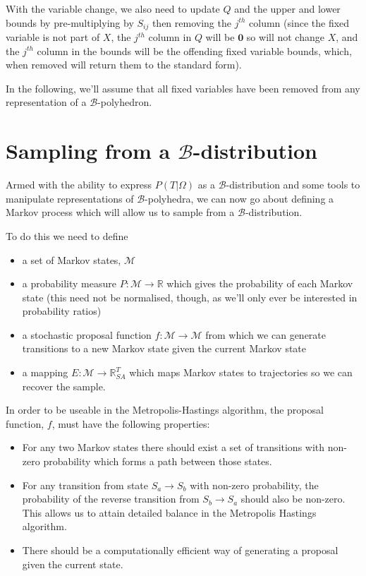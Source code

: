 \documentclass{article}
\begin{document}
With the variable change, we also need to update $Q$ and the upper and lower bounds by pre-multiplying by $S_{ij}$ then removing the $j^{th}$ column (since the fixed variable is not part of $X$, the $j^{th}$ column in $Q$ will be $\mathbf{0}$ so will not change $X$, and the $j^{th}$ column in the bounds will be the offending fixed variable bounds, which, when removed will return them to the standard form).

In the following, we'll assume that all fixed variables have been removed from any representation of a $\mathcal{B}$-polyhedron.

\section{Sampling from a $\mathcal{B}$-distribution}

Armed with the ability to express $P(T|\Omega)$ as a $\mathcal{B}$-distribution and some tools to manipulate representations of $\mathcal{B}$-polyhedra, we can now go about defining a Markov process which will allow us to sample from a $\mathcal{B}$-distribution.

To do this we need to define
\begin{itemize}
\item a set of Markov states, $\mathcal{M}$

\item a probability measure $P: \mathcal{M} \to \mathbb{R}$ which gives the probability of each Markov state (this need not be normalised, though, as we'll only ever be interested in probability ratios)

\item a stochastic proposal function $f:\mathcal{M} \to \mathcal{M}$ from which we can generate transitions to a new Markov state given the current Markov state

\item a mapping $E:\mathcal{M} \to \mathbb{R}^T_{SA}$ which maps Markov states to trajectories so we can recover the sample.
\end{itemize}

In order to be useable in the Metropolis-Hastings algorithm, the proposal function, $f$, must have the following properties:
\begin{itemize}
	\item For any two Markov states there should exist a set of transitions with non-zero probability which forms a path between those states.
	
	\item For any transition from state $S_a \to S_b$ with non-zero probability, the probability of the reverse transition from $S_b \to S_a$ should also be non-zero. This allows us to attain detailed balance in the Metropolis Hastings algorithm.
	
	\item There should be a computationally efficient way of generating a proposal given the current state. 
\end{itemize}
\end{document}
